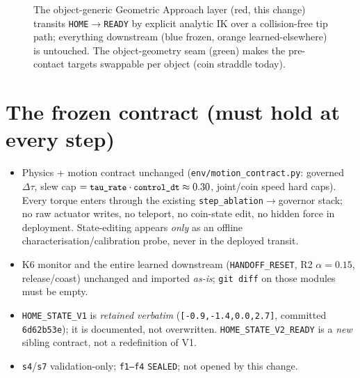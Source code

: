 \documentclass[11pt]{article}
\newcommand{\code}[1]{\texttt{\small #1}}
\begin{document}
\begin{figure}[h]\centering
\caption{The object-generic Geometric Approach layer (red, this change) transits \code{HOME}$\rightarrow$\code{READY} by
explicit analytic IK over a collision-free tip path; everything downstream (blue frozen, orange learned-elsewhere) is
untouched. The object-geometry seam (green) makes the pre-contact targets swappable per object (coin straddle today).}
\end{figure}

\section{The frozen contract (must hold at every step)}
\begin{itemize}[nosep,leftmargin=1.4em]
  \item Physics + motion contract unchanged (\code{env/motion\_contract.py}: governed $\Delta\tau$, slew cap
  $=\code{tau\_rate}\cdot\code{control\_dt}\approx0.30$, joint/coin speed hard caps). Every torque enters through the
  existing \code{step\_ablation}$\to$governor stack; no raw actuator writes, no teleport, no coin-state edit, no hidden
  force in deployment. State-editing appears \emph{only} as an offline characterisation/calibration probe, never in the
  deployed transit.
  \item K6 monitor and the entire learned downstream (\code{HANDOFF\_RESET}, R2 $\alpha=0.15$, release/coast) unchanged
  and imported \emph{as-is}; \code{git diff} on those modules must be empty.
  \item \code{HOME\_STATE\_V1} is \emph{retained verbatim} (\code{[-0.9,-1.4,0.0,2.7]}, committed \code{6d62b53e}); it is
  documented, not overwritten. \code{HOME\_STATE\_V2\_READY} is a \emph{new} sibling contract, not a redefinition of V1.
  \item \code{s4}/\code{s7} validation-only; \code{f1--f4} \code{SEALED}; not opened by this change.
\end{itemize}
\end{document}
